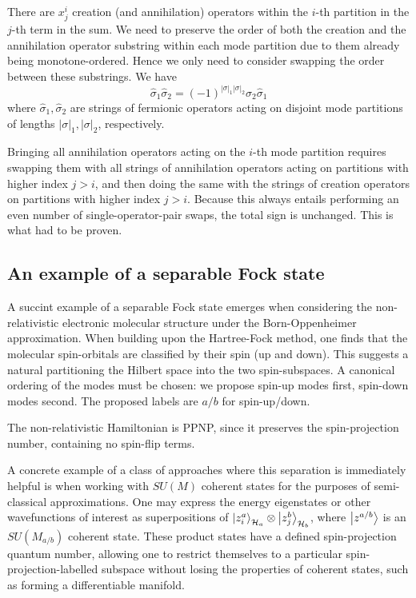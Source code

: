 \documentclass[12pt]{article}
\begin{document}
	There are $x^i_j$ creation (and annihilation) operators within the $i$-th partition in the $j$-th term in the sum. We need to preserve the order of both the creation and the annihilation operator substring within each mode partition due to them already being monotone-ordered. Hence we only need to consider swapping the order between these substrings. We have
	\begin{equation}
	\hat{\sigma}_1 \hat{\sigma}_2 = (-1)^{|\sigma|_1 |\sigma|_2} \hat{\sigma}_2 \hat{\sigma}_1
	\end{equation}
	where $\hat{\sigma}_1, \hat{\sigma}_2$ are strings of fermionic operators acting on disjoint mode partitions of lengths $|\sigma|_1, |\sigma|_2$, respectively.
	
	Bringing all annihilation operators acting on the $i$-th mode partition requires swapping them with all strings of annihilation operators acting on partitions with higher index $j>i$, and then doing the same with the strings of creation operators on partitions with higher index $j>i$. Because this always entails performing an even number of single-operator-pair swaps, the total sign is unchanged. This is what had to be proven.
	
	\subsection{An example of a separable Fock state}
	A succint example of a separable Fock state emerges when considering the non-relativistic electronic molecular structure under the Born-Oppenheimer approximation. When building upon the Hartree-Fock method, one finds that the molecular spin-orbitals are classified by their spin (up and down). This suggests a natural partitioning the Hilbert space into the two spin-subspaces. A canonical ordering of the modes must be chosen: we propose spin-up modes first, spin-down modes second. The proposed labels are $a/b$ for spin-up/down.
	
	The non-relativistic Hamiltonian is PPNP, since it preserves the spin-projection number, containing no spin-flip terms.
	
	A concrete example of a class of approaches where this separation is immediately helpful is when working with $SU(M)$ coherent states for the purposes of semi-classical approximations. One may express the energy eigenstates or other wavefunctions of interest as superpositions of $\ket{z^a_i}_{\mathcal{H}_a} \otimes \ket{z^b_j}_{\mathcal{H}_b}$, where $\ket{z^{a/b}}$ is an $SU(M_{a/b})$ coherent state. These product states have a defined spin-projection quantum number, allowing one to restrict themselves to a particular spin-projection-labelled subspace without losing the properties of coherent states, such as forming a differentiable manifold.
	
\end{document}
